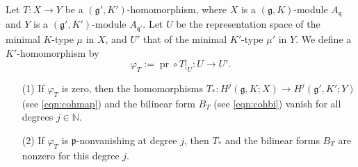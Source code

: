 \begin{theorem}
\label{thm:171556}
Let $T \colon X \to Y$ be a $({\mathfrak{g}}',K')$-homomorphism, 
 where $X$ is a $({\mathfrak{g}},K)$-module $A_{\mathfrak{q}}$
 and $Y$ is a $({\mathfrak{g}}',K')$-module $A_{\mathfrak{q}'}$.  
Let $U$ be the representation space
 of the minimal $K$-type $\mu$ in $X$, 
 and $U'$ that of the minimal $K'$-type $\mu'$ in $Y$.  
We define a $K'$-homomorphism by 
\begin{equation}
\label{eqn:phiT}
   \varphi_T := {\operatorname{pr}} \circ T|_{U}
   \colon U \to U'.  
\end{equation}
\begin{enumerate}
\item[{\rm{(1)}}]
If $\varphi_T$ is zero, 
 then the homomorphisms 
$
  T_{\ast} \colon 
  H^j({\mathfrak{g}},K;X) \to H^j({\mathfrak{g}}',K';Y)
$
 (see \eqref{eqn:cohmap})
 and the bilinear form $B_T$
 (see \eqref{eqn:cohbi})
 vanish for all degrees $j \in {\mathbb{N}}$.   
\item[{\rm{(2)}}]
If $\varphi_T$ is ${\mathfrak{p}}$-nonvanishing
 at degree $j$, 
 then $T_{\ast}$ and the bilinear forms $B_T$ are nonzero
  for this degree $j$.  
\end{enumerate}
\end{theorem}

